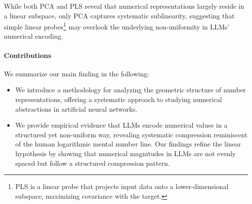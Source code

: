While both PCA and PLS reveal that numerical representations largely reside in a linear subspace, only PCA captures systematic sublinearity, suggesting that simple linear probes\footnote{PLS is a linear probe that projects input data onto a lower-dimensional subspace, maximizing covariance with the target.} may overlook the underlying non-uniformity in LLMs’ numerical encoding.




\paragraph{Contributions} We summarize our main finding in the following: 
\begin{itemize}
    \item
    We introduce a methodology for analyzing the geometric structure of number representations, offering a systematic approach to studying numerical abstractions in artificial neural networks.
    \item 
    We provide empirical evidence that LLMs encode numerical values in a structured yet non-uniform way, revealing systematic compression reminiscent of the human logarithmic mental number line. Our findings refine the linear hypothesis by showing that numerical magnitudes in LLMs are not evenly spaced but follow a structured compression pattern.    
\end{itemize}


